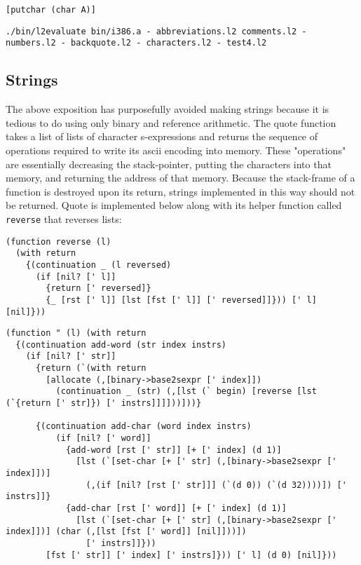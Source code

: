 \documentclass[twocolumn,landscape]{article}
\begin{document}
      \begin{lstlisting}[caption={test4.l2}]
[putchar (char A)]
      \end{lstlisting}
      
      \begin{lstlisting}[caption={shell}]
./bin/l2evaluate bin/i386.a - abbreviations.l2 comments.l2 - numbers.l2 - backquote.l2 - characters.l2 - test4.l2
      \end{lstlisting}

    \subsection{Strings}\label{sec:strings}
      The above exposition has purposefully avoided making strings because it is tedious to do using only binary and reference arithmetic. The quote function takes a list of lists of character s-expressions and returns the sequence of operations required to write its ascii encoding into memory. These "operations" are essentially decreasing the stack-pointer, putting the characters into that memory, and returning the address of that memory. Because the stack-frame of a function is destroyed upon its return, strings implemented in this way should not be returned. Quote is implemented below along with its helper function called \lstinline{reverse} that reverses lists:

      \begin{lstlisting}[caption={reverse.l2}]
(function reverse (l)
  (with return
    {(continuation _ (l reversed)
      (if [nil? [' l]]
        {return [' reversed]}
        {_ [rst [' l]] [lst [fst [' l]] [' reversed]]})) [' l] [nil]}))
      \end{lstlisting}
      
      \begin{lstlisting}[caption={strings.l2}]
(function " (l) (with return
  {(continuation add-word (str index instrs)
    (if [nil? [' str]]
      {return (`(with return
        [allocate (,[binary->base2sexpr [' index]])
          (continuation _ (str) (,[lst (` begin) [reverse [lst (`{return [' str]}) [' instrs]]]]))]))}

      {(continuation add-char (word index instrs)
          (if [nil? [' word]]
            {add-word [rst [' str]] [+ [' index] (d 1)]
              [lst (`[set-char [+ [' str] (,[binary->base2sexpr [' index]])]
                (,(if [nil? [rst [' str]]] (`(d 0)) (`(d 32))))]) [' instrs]]}
            {add-char [rst [' word]] [+ [' index] (d 1)]
              [lst (`[set-char [+ [' str] (,[binary->base2sexpr [' index]])] (char (,[lst [fst [' word]] [nil]]))])
                [' instrs]]}))
        [fst [' str]] [' index] [' instrs]})) [' l] (d 0) [nil]}))
      \end{lstlisting}
      
\end{document}
